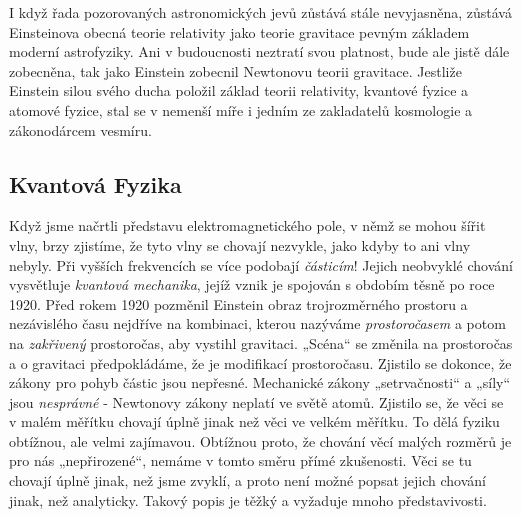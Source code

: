         I když řada pozorovaných astronomických jevů zůstává stále nevyjasněna, zůstává Einsteinova
        obecná teorie relativity jako teorie gravitace pevným základem moderní astrofyziky. Ani v
        budoucnosti neztratí svou platnost, bude ale jistě dále zobecněna, tak jako Einstein
        zobecnil Newtonovu teorii gravitace. Jestliže Einstein silou svého ducha položil základ
        teorii relativity, kvantové fyzice a atomové fyzice, stal se v nemenší míře i jedním ze
        zakladatelů kosmologie a zákonodárcem vesmíru.


    \subsection{Kvantová Fyzika}\label{fyz:IchapIIsecIVssecII}
      Když jsme načrtli představu elektromagnetického pole, v němž se mohou šířit vlny, brzy
      zjistíme, že tyto vlny se chovají nezvykle, jako kdyby to ani vlny nebyly. Při vyšších
      frekvencích se více podobají \emph{částicím}! Jejich neobvyklé chování vysvětluje
      \emph{kvantová mechanika}, jejíž vznik je spojován s obdobím těsně po roce 1920. Před rokem
      1920 pozměnil Einstein obraz trojrozměrného prostoru a nezávislého času nejdříve na kombinaci,
      kterou nazýváme \emph{prostoročasem} a potom na \emph{zakřivený} prostoročas, aby vystihl
      gravitaci. „Scéna“ se změnila na prostoročas a o gravitaci předpokládáme, že je modifikací
      prostoročasu. Zjistilo se dokonce, že zákony pro pohyb částic jsou nepřesné. Mechanické zákony
      „setrvačnosti“ a „síly“ jsou \emph{nesprávné} - Newtonovy zákony neplatí ve světě atomů.
      Zjistilo se, že věci se v malém měřítku chovají úplně jinak než věci ve velkém měřítku. To
      dělá fyziku obtížnou, ale velmi zajímavou. Obtížnou proto, že chování věcí malých rozměrů je
      pro nás „nepřirozené“, nemáme v tomto směru přímé zkušenosti. Věci se tu chovají úplně jinak,
      než jsme zvyklí, a proto není možné popsat jejich chování jinak, než analyticky. Takový popis
      je těžký a vyžaduje mnoho představivosti.
      
